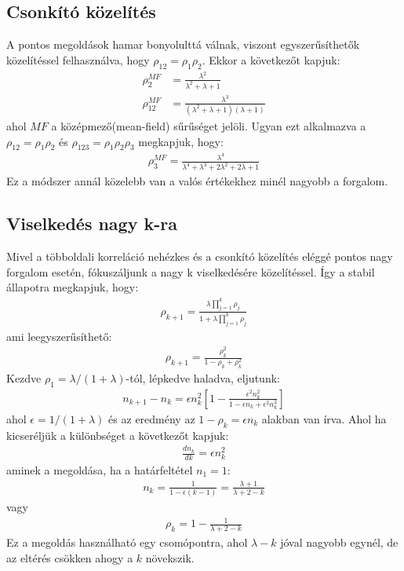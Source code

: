 \documentclass{article}
\begin{document}
	\subsection{Csonkító közelítés}
	A pontos megoldások hamar bonyolulttá válnak, viszont egyszerűsíthetők közelítéssel felhasználva, hogy $\rho_{12}=\rho_1\rho_2$. Ekkor a következőt kapjuk: 
	\begin{align*}
		\rho_2^{MF}&=\frac{\lambda^2}{\lambda^2+\lambda+1}\\
		\rho_{12}^{MF}&=\frac{\lambda^3}{(\lambda^2+\lambda+1)(\lambda+1)}
	\end{align*}
	ahol $MF$ a középmező(mean-field) sűrűséget jelöli. Ugyan ezt alkalmazva a $\rho_{12}=\rho_1\rho_2$ és $\rho_{123}=\rho_1\rho_2\rho_3$ megkapjuk, hogy:
	\begin{align}
		\rho_3^{MF}=\frac{\lambda^4}{\lambda^4+\lambda^3+2\lambda^2+2\lambda+1}
	\end{align}
	Ez a módszer annál közelebb van a valós értékekhez minél nagyobb a forgalom.
	\subsection{Viselkedés nagy k-ra}
	Mivel a többoldali korreláció nehézkes és a csonkító közelítés eléggé pontos nagy forgalom esetén, fókuszáljunk a nagy k viselkedésére közelítéssel. Így a stabil állapotra megkapjuk, hogy:
	\begin{align}
		\rho_{k+1}=\frac{\lambda \prod\limits_{j=1}^{k} \rho_j}{1+\lambda\prod\limits_{ j=1 }^{ k } \rho_j}
	\end{align}
	ami leegyszerűsíthető:
	\begin{align}
		\rho_{k+1}=\frac{\rho_k^2}{1-\rho_k+\rho_k^2}
	\end{align}
	Kezdve $\rho_1=\lambda/(1+\lambda)$-tól, lépkedve haladva, eljutunk:
	\begin{align}
		n_{k+1}-n_k=\epsilon n_k^2\left[1-\frac{\epsilon^2n_k^2}{1-\epsilon n_k+\epsilon^2n_k^2}\right]
	\end{align}
	ahol $\epsilon=1/(1+\lambda)$ és az eredmény az $1-\rho_k = \epsilon n_k$ alakban van írva. Ahol ha kicseréljük a különbséget a következőt kapjuk:
	\begin{align}
		\frac{dn_k}{dk}=\epsilon n_k^2
	\end{align}
	aminek a megoldása, ha a határfeltétel $n_1=1$:
	\begin{align}
		\label{eq7}
		n_k=\frac{1}{1-\epsilon(k-1)}=\frac{\lambda+1}{\lambda+2-k}
	\end{align}
	vagy
	\begin{align}
		\rho_k=1-\frac{1}{\lambda+2-k}
	\end{align}
	Ez a megoldás használható egy csomópontra, ahol $\lambda - k$ jóval nagyobb egynél, de az eltérés csökken ahogy a $k$ növekszik.
\end{document}
